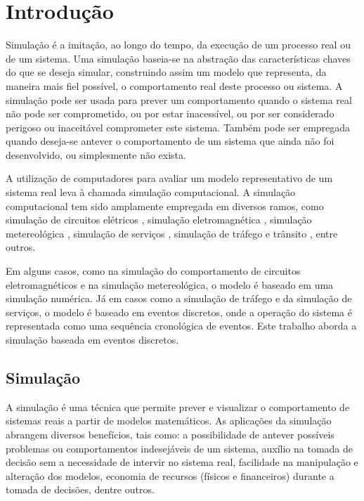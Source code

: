 \chapter{Introdução}

Simulação é a imitação, ao longo do tempo, da execução de um processo real ou de um sistema\cite{DESS-PH-2010}. Uma simulação baseia-se na abstração das características chaves do que se deseja simular, construindo assim um modelo que representa, da maneira mais fiel possível, o comportamento real deste processo ou sistema. A simulação pode ser usada para prever um comportamento quando o sistema real não pode ser comprometido, ou por estar inacessível, ou por ser considerado perigoso ou inaceitável comprometer este sistema. Também pode ser empregada quando deseja-se antever o comportamento de um sistema que ainda não foi desenvolvido, ou simplesmente não exista\cite{REALWORLD-2008}.

A utilização de computadores para avaliar um modelo representativo de um sistema real leva à chamada simulação computacional. A simulação computacional tem sido amplamente empregada em diversos ramos, como simulação de circuitos elétricos \cite{SPICE}, simulação eletromagnética \cite{OskooiRo10}, simulação metereológica \cite{WEATHER}, simulação de serviços \cite{SERVICES}, simulação de tráfego e trânsito \cite{TRAFFIC}, entre outros.

Em alguns casos, como na simulação do comportamento de circuitos eletromagnéticos e na simulação metereológica, o modelo é baseado em uma simulação numérica\cite{NUMERICAL}. Já em casos como a simulação de tráfego e da simulação de serviços, o modelo é baseado em eventos discretos, onde a operação do sistema é representada como uma sequência cronológica de eventos. Este trabalho aborda a simulação baseada em eventos discretos.

\section{Simulação}

A simulação é uma técnica que permite prever e visualizar o comportamento de sistemas reais a partir de modelos matemáticos. As aplicações da simulação abrangem diversos benefícios, tais como: a possibilidade de antever possíveis problemas ou comportamentos indesejáveis de um sistema, auxílio na tomada de decisão sem a necessidade de intervir no sistema real, facilidade na manipulação e alteração dos modelos, economia de recursos (físicos e financeiros) durante a tomada de decisões, dentre outros.

